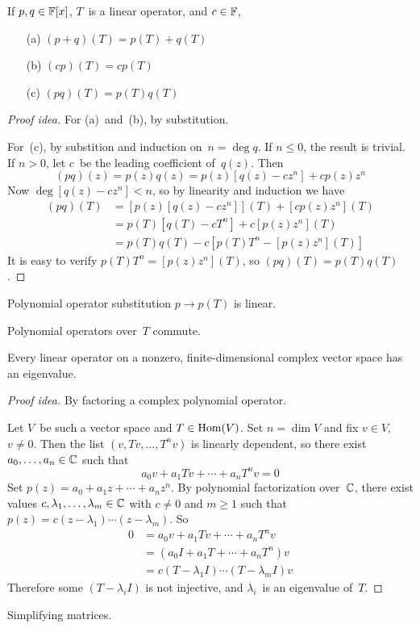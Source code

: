 \begin{thm}
If \(p,q\in\mathbb{F}[x]\), \(T\)~is a linear operator, and \(c\in\mathbb{F}\),
\begin{enumerate}[itemsep=0pt]
\item[(a)] \((p+q)(T)=p(T)+q(T)\)
\item[(b)] \((cp)(T)=cp(T)\)
\item[(c)] \((pq)(T)=p(T)q(T)\)
\end{enumerate}
\end{thm}
\begin{proof}[Proof idea]
For (a)~and~(b), by substitution.

For~(c), by substition and induction on~\(n=\deg q\). If \(n\le0\), the result is trivial. If \(n>0\), let \(c\)~be the leading coefficient of~\(q(z)\). Then
\[(pq)(z)=p(z)q(z)=p(z)[q(z)-cz^n]+cp(z)z^n\]
Now \(\deg[q(z)-cz^n]<n\), so by linearity and induction we have
\begin{align*}
(pq)(T)&=[p(z)[q(z)-cz^n]](T)+[cp(z)z^n](T)\\
	&=p(T)[q(T)-cT^n]+c[p(z)z^n](T)\\
	&=p(T)q(T)-c[p(T)T^n-[p(z)z^n](T)]
\end{align*}
It is easy to verify \(p(T)T^n=[p(z)z^n](T)\), so \((pq)(T)=p(T)q(T)\).
\end{proof}
\begin{cor}
Polynomial operator substitution \(p\to p(T)\) is linear.
\end{cor}
\begin{cor}
Polynomial operators over~\(T\) commute.
\end{cor}

\begin{thm}
Every linear operator on a nonzero, finite-dimensional complex vector space has an eigenvalue.
\end{thm}
\begin{proof}[Proof idea]
By factoring a complex polynomial operator.

Let \(V\)~be such a vector space and \(T\in\operatorname{Hom}(V)\). Set \(n=\dim V\) and fix \(v\in V\), \(v\ne0\). Then the list \((v,Tv,\ldots,T^nv)\) is linearly dependent, so there exist \(a_0,\ldots,a_n\in\mathbb{C}\) such that
\[a_0v+a_1Tv+\cdots+a_nT^nv=0\]
Set \(p(z)=a_0+a_1z+\cdots+a_nz^n\). By polynomial factorization over~\(\mathbb{C}\), there exist values \(c,\lambda_1,\ldots,\lambda_m\in\mathbb{C}\) with \(c\ne0\) and \(m\ge1\) such that \(p(z)=c(z-\lambda_1)\cdots(z-\lambda_m)\). So
\begin{align*}
0&=a_0v+a_1Tv+\cdots+a_nT^nv\\
	&=(a_0I+a_1T+\cdots+a_nT^n)v\\
	&=c(T-\lambda_1I)\cdots(T-\lambda_mI)v
\end{align*}
Therefore some \((T-\lambda_iI)\) is not injective, and \(\lambda_i\)~is an eigenvalue of~\(T\).
\end{proof}
\begin{app}
Simplifying matrices.
\end{app}

